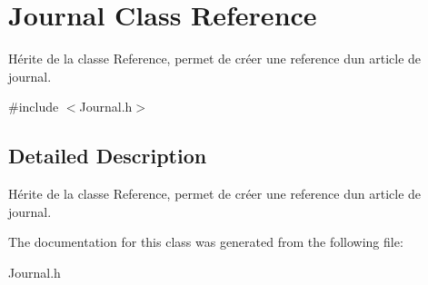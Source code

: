 \hypertarget{classJournal}{}\section{Journal Class Reference}
\label{classJournal}


Hérite de la classe Reference, permet de créer une reference d\textquotesingle{}un article de journal.  




{\ttfamily \#include $<$Journal.\+h$>$}



\subsection{Detailed Description}
Hérite de la classe Reference, permet de créer une reference d\textquotesingle{}un article de journal. 

The documentation for this class was generated from the following file\+:\begin{DoxyCompactItemize}
\item 
Journal.\+h\end{DoxyCompactItemize}

